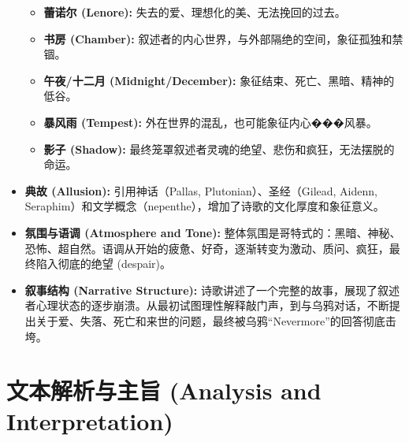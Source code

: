 \documentclass[12pt, a4paper]{article}
\begin{document}
\begin{itemize}
\begin{itemize}
            \item \textbf{蕾诺尔 (Lenore):} 失去的爱、理想化的美、无法挽回的过去。
            \item \textbf{书房 (Chamber):} 叙述者的内心世界，与外部隔绝的空间，象征孤独和禁锢。
            \item \textbf{午夜/十二月 (Midnight/December):} 象征结束、死亡、黑暗、精神的低谷。
            \item \textbf{暴风雨 (Tempest):} 外在世界的混乱，也可能象征内心���风暴。
            \item \textbf{影子 (Shadow):} 最终笼罩叙述者灵魂的绝望、悲伤和疯狂，无法摆脱的命运。
        \end{itemize}
    \item \textbf{典故 (Allusion):} 引用神话（Pallas, Plutonian）、圣经（Gilead, Aidenn, Seraphim）和文学概念（nepenthe），增加了诗歌的文化厚度和象征意义。
    \item \textbf{氛围与语调 (Atmosphere and Tone):} 整体氛围是哥特式的：黑暗、神秘、恐怖、超自然。语调从开始的疲惫、好奇，逐渐转变为激动、质问、疯狂，最终陷入彻底的绝望 (despair)。
    \item \textbf{叙事结构 (Narrative Structure):} 诗歌讲述了一个完整的故事，展现了叙述者心理状态的逐步崩溃。从最初试图理性解释敲门声，到与乌鸦对话，不断提出关于爱、失落、死亡和来世的问题，最终被乌鸦“Nevermore”的回答彻底击垮。
\end{itemize}

\section{文本解析与主旨 (Analysis and Interpretation)}
\end{document}

